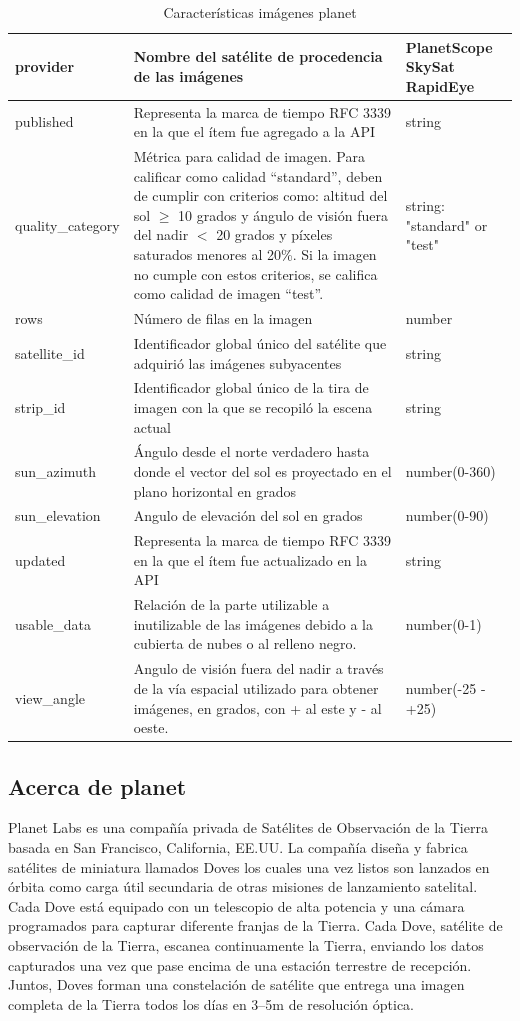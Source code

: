 \begin{table}[H]
{\begin{tabular}{|M{0.2\textwidth}|M{0.9\textwidth}|
   M{0.15\textwidth}|}
provider & Nombre del satélite de procedencia de las imágenes & 
PlanetScope
SkySat
RapidEye
\\ \hline
published & Representa la marca de tiempo RFC 3339 en la que el ítem fue agregado a la API & string\\ \hline
quality\_category	& Métrica para calidad de imagen. Para calificar como calidad “standard”, deben de cumplir con criterios como: altitud del sol $\geq$ 10 grados y ángulo de visión fuera del nadir $<$ 20 grados y píxeles saturados menores al 20\%. Si la imagen no cumple con estos criterios, se califica como calidad de imagen
“test”. & string: "standard" or  "test"\\ \hline
rows& Número de filas en la imagen & number	\\ \hline
satellite\_id& Identificador global único del satélite que adquirió las imágenes subyacentes & string	\\ \hline
strip\_id& Identificador global único de la tira de imagen con la que se recopiló la escena actual & string	\\ \hline
sun\_azimuth & Ángulo desde el norte verdadero hasta donde el vector del sol es proyectado en el plano horizontal en grados & number(0-360)\\ \hline
sun\_elevation & Angulo de elevación del sol en grados & number(0-90)\\ \hline
updated& Representa la marca de tiempo RFC 3339 en la que el ítem fue actualizado en la API & string\\ \hline
usable\_data & Relación de la parte utilizable a inutilizable de las imágenes debido a la cubierta de nubes o al relleno negro. & number(0-1)\\ \hline
view\_angle	& Angulo de visión fuera del nadir a través de la vía espacial utilizado para obtener imágenes, en grados, con + al este y - al oeste.& number(-25 - +25)\\ \hline
    \end{tabular}}
    \caption{Características imágenes planet}
    \label{tab:my_label}
\end{table}

\subsection{Acerca de planet}
Planet Labs es una compañía privada de Satélites de Observación de la Tierra basada en San Francisco, California, EE.UU. La compañía diseña y fabrica satélites de miniatura llamados Doves los cuales una vez listos son lanzados en órbita como carga útil secundaria de otras misiones de lanzamiento satelital. Cada Dove está equipado con un telescopio de alta potencia y una cámara programados para capturar diferente franjas de la Tierra. Cada Dove, satélite de observación de la Tierra, escanea continuamente la Tierra, enviando los datos capturados una vez que pase encima de una estación terrestre de recepción. Juntos, Doves forman una constelación de satélite que entrega una imagen completa de la Tierra todos los días en 3–5m de resolución óptica.

